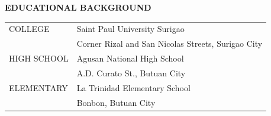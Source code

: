 \documentclass[12pt]{report}
\begin{document}
\begin{spacing}{1.55}
\vspace{20pt}

\textbf{EDUCATIONAL BACKGROUND}

\vspace{-10pt}
\hrulefill

\begin{tabular}{@{}l@{ : }l}
    COLLEGE & Saint Paul University Surigao \\
    & Corner Rizal and San Nicolas Streets, Surigao City \\
    HIGH SCHOOL & Agusan National High School\\
    & A.D. Curato St., Butuan City \\
    ELEMENTARY & La Trinidad Elementary School \\
    & Bonbon, Butuan City \\
\end{tabular}

\end{spacing}
\end{document}
